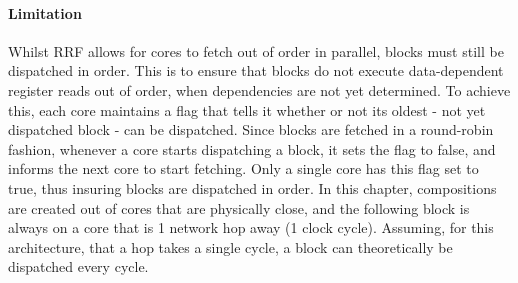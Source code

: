 
\paragraph*{Limitation}

Whilst RRF allows for cores to fetch out of order in parallel, blocks must still be dispatched in order.
This is to ensure that blocks do not execute data-dependent register reads out of order, when dependencies are not yet determined.
To achieve this, each core maintains a flag that tells it whether or not its oldest - not yet dispatched block - can be dispatched.
Since blocks are fetched in a round-robin fashion, whenever a core starts dispatching a block, it sets the flag to false, and informs the next core to start fetching.
Only a single core has this flag set to true, thus insuring blocks are dispatched in order.
In this chapter, compositions are created out of cores that are physically close, and the following block is always on a core that is 1 network hop away (1 clock cycle).
Assuming, for this architecture, that a hop takes a single cycle, a block can theoretically be dispatched every cycle.



